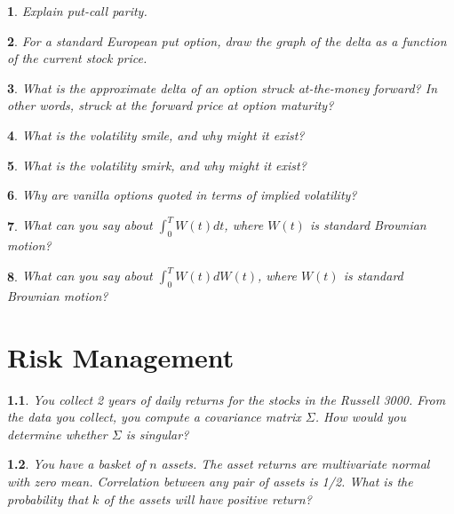 \documentclass{report}
\newtheorem{problem}{}
\numberwithin{problem}{chapter} %
\begin{document}
\begin{problem}
Explain put-call parity.
\end{problem}

\begin{problem}
\cite{CRACK} For a standard European put option, draw the graph of the delta as a function of the current stock price.
\end{problem}

\begin{problem}
What is the approximate delta of an option struck at-the-money forward? In other words, struck at the forward price at option maturity?
\end{problem}

\begin{problem}
What is the volatility smile, and why might it exist?
\end{problem}

\begin{problem}
What is the volatility smirk, and why might it exist?
\end{problem}

\begin{problem}
Why are vanilla options quoted in terms of implied volatility?
\end{problem}

\begin{problem}
\cite{CRACK} What can you say about $\int_0^{T} W(t)dt$, where $W(t)$ is standard Brownian motion?
\end{problem}

\begin{problem}
\cite{CRACK} What can you say about $\int_0^{T} W(t)dW(t)$, where $W(t)$ is standard Brownian motion?
\end{problem}

\chapter{Risk Management}

\begin{problem}
You collect 2 years of daily returns for the stocks in the Russell 3000. From the data you collect, you compute a covariance matrix $\Sigma$. How would you determine whether $\Sigma$ is singular?
\end{problem}

\begin{problem}
You have a basket of $n$ assets. The asset returns are multivariate normal with zero mean. Correlation between any pair of assets is 1/2. What is the probability that $k$ of the assets will have positive return?
\end{problem}
\end{document}
